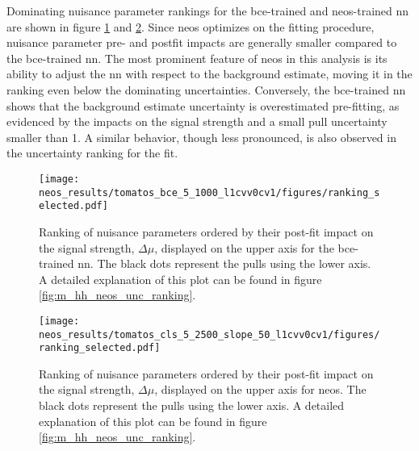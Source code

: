 Dominating nuisance parameter rankings for the \ac{bce}-trained and neos-trained \ac{nn} are shown in figure \ref{fig:neos_valid_ranking_bce} and \ref{fig:neos_valid_ranking_cls}. Since \ac{neos} optimizes on the fitting procedure, nuisance parameter pre- and postfit impacts are generally smaller compared to the \ac{bce}-trained \ac{nn}. The most prominent feature of \ac{neos} in this analysis is its ability to adjust the \ac{nn} with respect to the background estimate, moving it in the ranking even below the dominating uncertainties. Conversely, the \ac{bce}-trained \ac{nn} shows that the background estimate uncertainty is overestimated pre-fitting, as evidenced by the impacts on the signal strength and a small pull uncertainty smaller than 1. A similar behavior, though less pronounced, is also observed in the uncertainty ranking for the \mhh fit.

\begin{figure}
    \centering
    \texttt{[image: neos\_results/tomatos\_bce\_5\_1000\_l1cvv0cv1/figures/ranking\_selected.pdf]}
    \caption[]{Ranking of nuisance parameters ordered by their post-fit impact on the signal strength, $\Delta\mu$, displayed on the upper axis for the \ac{bce}-trained \ac{nn}. The black dots represent the pulls using the lower axis. A detailed explanation of this plot can be found in figure \ref{fig:m_hh_neos_unc_ranking}.}
    \label{fig:neos_valid_ranking_bce}
\end{figure}
\begin{figure}
    \centering
    \texttt{[image: neos\_results/tomatos\_cls\_5\_2500\_slope\_50\_l1cvv0cv1/figures/ranking\_selected.pdf]}
    \caption[]{Ranking of nuisance parameters ordered by their post-fit impact on the signal strength, $\Delta\mu$, displayed on the upper axis for \ac{neos}. The black dots represent the pulls using the lower axis. A detailed explanation of this plot can be found in figure \ref{fig:m_hh_neos_unc_ranking}.}
    \label{fig:neos_valid_ranking_cls}
\end{figure}

